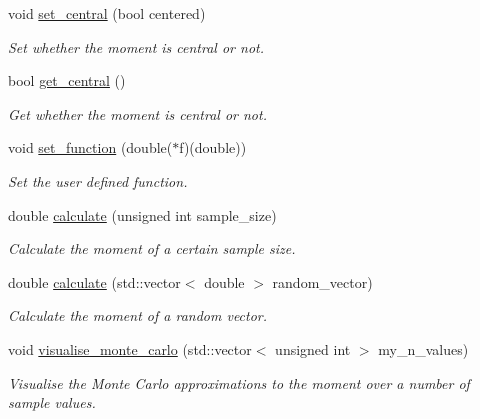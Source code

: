 \begin{DoxyCompactItemize}
\mbox{\label{classMoments_ac5549fdcf86889e7cfc7527801279486}} 
void \hyperlink{classMoments_ac5549fdcf86889e7cfc7527801279486}{set\+\_\+central} (bool centered)
\begin{DoxyCompactList}\small\item\em Set whether the moment is central or not. \end{DoxyCompactList}\item 
\mbox{\label{classMoments_a26d12173d77025d2542765d317df3f13}} 
bool \hyperlink{classMoments_a26d12173d77025d2542765d317df3f13}{get\+\_\+central} ()
\begin{DoxyCompactList}\small\item\em Get whether the moment is central or not. \end{DoxyCompactList}\item 
\mbox{\label{classMoments_a52c7c94bb813177b284026917394b98c}} 
void \hyperlink{classMoments_a52c7c94bb813177b284026917394b98c}{set\+\_\+function} (double($\ast$f)(double))
\begin{DoxyCompactList}\small\item\em Set the user defined function. \end{DoxyCompactList}\item 
\mbox{\label{classMoments_a93de7ec3d78a17b2de38311250b7ecb8}} 
double \hyperlink{classMoments_a93de7ec3d78a17b2de38311250b7ecb8}{calculate} (unsigned int sample\+\_\+size)
\begin{DoxyCompactList}\small\item\em Calculate the moment of a certain sample size. \end{DoxyCompactList}\item 
\mbox{\label{classMoments_aef8bc3f964aa46728ef3ee8f2fcbc2e2}} 
double \hyperlink{classMoments_aef8bc3f964aa46728ef3ee8f2fcbc2e2}{calculate} (std\+::vector$<$ double $>$ random\+\_\+vector)
\begin{DoxyCompactList}\small\item\em Calculate the moment of a random vector. \end{DoxyCompactList}\item 
\mbox{\label{classMoments_a71aba384537c7811da1183956e1299df}} 
void \hyperlink{classMoments_a71aba384537c7811da1183956e1299df}{visualise\+\_\+monte\+\_\+carlo} (std\+::vector$<$ unsigned int $>$ my\+\_\+n\+\_\+values)
\begin{DoxyCompactList}\small\item\em Visualise the Monte Carlo approximations to the moment over a number of sample values. \end{DoxyCompactList}\end{DoxyCompactItemize}


